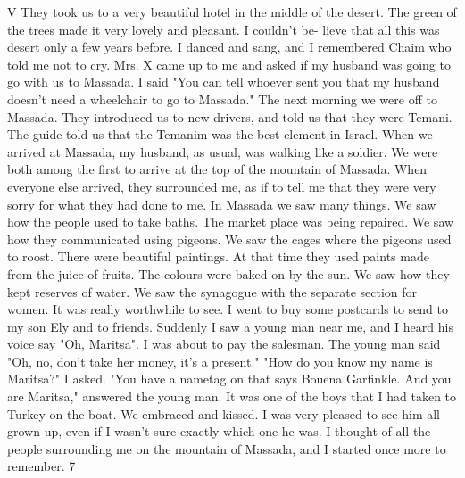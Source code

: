 V
They took us to a very beautiful hotel in the middle of the desert. 
The green of the trees made it very lovely and pleasant. I couldn't be-
lieve that all this was desert only a few years before. I danced and sang, 
and I remembered Chaim who told me not to cry. Mrs. X came up to me and 
asked if my husband was going to go with us to Massada. I said "You can 
tell whoever sent you that my husband doesn't need a wheelchair to go 
to Massada." 
The next morning we were off to Massada. They introduced us to new 
drivers, and told us that they were Temani.- The guide told us that the 
Temanim was the best element in Israel. When we arrived at Massada, my 
husband, as usual, was walking like a soldier. We were both among the 
first to arrive at the top of the mountain of Massada. When everyone else 
arrived, they surrounded me, as if to tell me that they were very sorry 
for what they had done to me. 
In Massada we saw many things. We saw how the people used to take 
baths. The market place was being repaired. We saw how they communicated 
using pigeons. We saw the cages where the pigeons used to roost. There 
were beautiful paintings. At that time they used paints made from the 
juice of fruits. The colours were baked on by the sun. We saw how they 
kept reserves of water. We saw the synagogue with the separate section 
for women. It was really worthwhile to see. 
I went to buy some postcards to send to my son Ely and to friends. 
Suddenly I saw a young man near me, and I heard his voice say "Oh, Maritsa". I was about to pay the salesman. The young man said "Oh, no, don't take her money, it's a present." 
"How do you know my name is Maritsa?" I asked. 
 "You have a nametag on that says Bouena Garfinkle. And you are Maritsa," answered the young man. It was one of the boys that I had taken to Turkey on the boat. We embraced and kissed. I was very pleased to see him all grown up, even if I wasn't sure exactly which one he was. I 
thought of all the people surrounding me on the mountain of Massada, and 
I started once more to remember. 
7 

